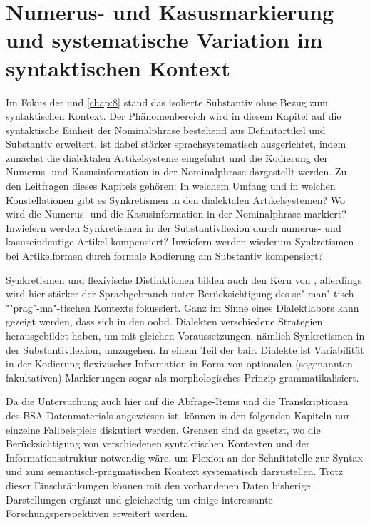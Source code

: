 \chapter[Numerus- und Kasusmarkierung]{Numerus- und Kasusmarkierung und systematische Variation im syntaktischen Kontext}
\label{chap:9}\largerpage
Im Fokus der  und \ref{chap:8} stand das isolierte Substantiv ohne Bezug zum syntaktischen Kontext. Der Phänomenbereich wird in diesem Kapitel auf die syntaktische Einheit der Nominalphrase bestehend aus Definitartikel und Substantiv erweitert.  ist dabei stärker sprachsystematisch ausgerichtet, indem zunächst die dialektalen Artikelsysteme eingeführt und die Kodierung der Numerus- und Kasusinformation in der Nominalphrase dargestellt werden. Zu den Leitfragen dieses Kapitels gehören: In welchem Umfang und in welchen Konstellationen gibt es Synkretismen in den dialektalen Artikelsystemen? Wo wird die Numerus- und die Kasusinformation in der Nominalphrase markiert? Inwiefern werden Synkretismen in der Substantivflexion durch numerus- und kasuseindeutige Artikel kompensiert? Inwiefern werden wiederum Syn\-kretismen bei Artikelformen durch formale Kodierung am Substantiv kompensiert?

Synkretismen und flexivische Distinktionen bilden auch den Kern von , allerdings wird hier stärker der Sprachgebrauch unter Berücksichtigung des se"-man"-tisch-""prag"-ma"-tischen Kontexts fokussiert. Ganz im Sinne eines Dialektlabors kann gezeigt werden, dass sich in den oobd. Dialekten verschiedene Strategien herausgebildet haben, um mit gleichen Voraussetzungen, nämlich Synkretismen in der Substantivflexion, umzugehen. In einem Teil der bair. Dialekte ist Variabilität in der Kodierung flexivischer Information in Form von optionalen (sogenannten fakultativen) Markierungen sogar als morphologisches Prinzip grammatikalisiert.


Da die Untersuchung auch hier auf die Abfrage-Items und die Transkriptionen des BSA-Datenmaterials angewiesen ist, können in den folgenden Kapiteln nur einzelne Fallbeispiele diskutiert werden. Grenzen sind da gesetzt, wo die Berücksichtigung von verschiedenen syntaktischen Kontexten und der Informationsstruktur notwendig wäre, um Flexion an der Schnittstelle zur Syntax und zum semantisch-pragmatischen Kontext systematisch darzustellen. Trotz dieser Einschränkungen können mit den vorhandenen Daten bisherige Darstellungen ergänzt und gleichzeitig um einige interessante Forschungsperspektiven erweitert werden.


